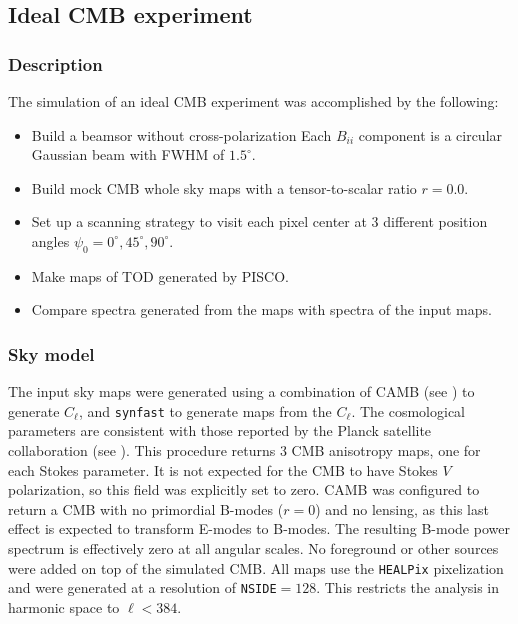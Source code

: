 \documentclass[a4paper,11pt]{article}
\begin{document}
\subsection{Ideal CMB experiment}
\label{sec::ideal_full_sky}

\subsubsection{Description}

The simulation of an ideal CMB experiment was accomplished by the following:

\begin{itemize}
	\item Build a beamsor without cross-polarization Each $B_{ii}$ component is a circular Gaussian beam with FWHM of $1.5^\circ$.
	\item Build mock CMB whole sky maps with a tensor-to-scalar ratio $r=0.0$.
	\item Set up a scanning strategy to visit each pixel center at 3 different position angles $\psi_0 = 0^{\circ},45^{\circ},90^{\circ}$. 
	\item Make maps of TOD generated by PISCO. 
	\item Compare spectra generated from the maps with spectra of the input maps.
\end{itemize}

\subsubsection{Sky model}
\label{subsec::sky_model}

The input sky maps were generated using a combination of CAMB (see \cite{Lewis:2002ah}) to generate $C_\ell$, and \texttt{synfast} to generate maps from the $C_\ell$. The cosmological parameters are consistent with those reported by the Planck satellite collaboration (see \cite{2016A&A...594A..13P}). This procedure returns 3 CMB anisotropy maps, one for each Stokes parameter. It is not expected for the CMB to have Stokes $V$ polarization, so this field was explicitly set to zero. CAMB was configured to return a CMB with no primordial B-modes ($r=0$) and no lensing, as this last effect is expected to transform E-modes to B-modes. The resulting B-mode power spectrum is effectively zero at all angular scales. No foreground or other sources were added on top of the simulated CMB. All maps use the \texttt{HEALPix} pixelization and were generated at a resolution of \texttt{NSIDE}$=128$. This restricts the analysis in harmonic space to $\ell < 384$.
\end{document}
